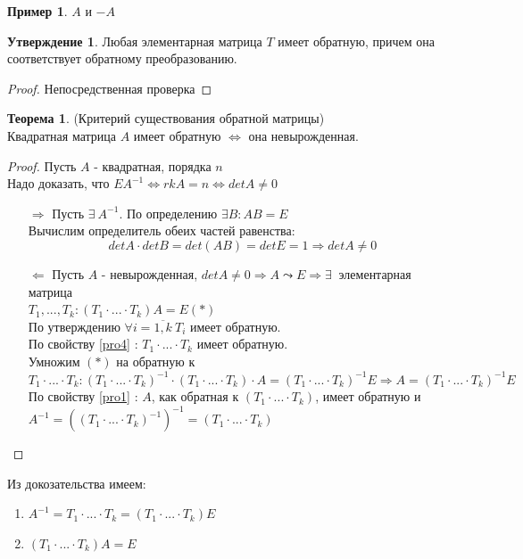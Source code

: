 \documentclass[a4paper, 12pt]{article}
\theoremstyle{definition}
\newtheorem*{theorem}{Теорема}
\newtheorem*{subtheorem}{Утверждение}
\newtheorem*{example1}{Пример}
\begin{document}
  \begin{example1}
    $A$ и $-A$ 
  \end{example1}
  \begin{subtheorem}
    Любая элементарная матрица $T$ имеет обратную, причем она соответствует обратному преобразованию. 
  \end{subtheorem} 
  \begin{proof}
    Непосредственная проверка
  \end{proof}
  \begin{theorem}
    (Критерий существования обратной матрицы) \\
    Квадратная матрица $A$ имеет обратную $\Longleftrightarrow $ она невырожденная.
  \end{theorem} 
  \begin{proof}
    Пусть $A$ - квадратная, порядка $n$ \\
    Надо доказать, что $EA^{-1} \Longleftrightarrow rkA = n \Longleftrightarrow detA \not = 0$ 
    \begin{itemize}
      \item[\underline{$\Longrightarrow$}] Пусть $\exists \ A^{-1}$. По определению $\exists B: AB = E$ \\
      Вычислим определитель обеих частей равенства:
      $$detA\cdot detB = det(AB) = detE = 1 \Longrightarrow detA \not = 0$$ 
      \item[\underline{$\Longleftarrow$}] Пусть $A$ - невырожденная, $detA \not = 0 \Longrightarrow A \leadsto E \Longrightarrow \exists \ $ элементарная матрица \\
      $T_1,...,T_k: (T_1 \cdot ... \cdot T_k)A = E (*)$ \\
      По утверждению $\forall i = \overline{1,k} \ T_i$ имеет обратную.\\
      По свойству \eqref{pro4} : $T_1 \cdot ... \cdot T_k$ имеет обратную. \\
      Умножим $(*)$ на обратную к $T_1 \cdot ... \cdot T_k: (T_1 \cdot ... \cdot T_k)^{-1} \cdot (T_1 \cdot ... \cdot T_k) \cdot A = (T_1 \cdot ... \cdot T_k)^{-1}E \Longrightarrow A = (T_1 \cdot ... \cdot T_k)^{-1}E$ \\
      По свойству \eqref{pro1} : $A$, как обратная к $(T_1 \cdot ... \cdot T_k)$, имеет обратную и $A^{-1} = ((T_1 \cdot ... \cdot T_k)^{-1})^{-1} = (T_1 \cdot ... \cdot T_k)$
    \end{itemize}
  \end{proof} 
  Из докозательства имеем:  
  \begin{enumerate}
    \item $A^{-1} = T_1 \cdot ... \cdot T_k = (T_1 \cdot ... \cdot T_k)E$
    \item $(T_1 \cdot ... \cdot T_k)A =E$ 
  \end{enumerate}
\end{document}
